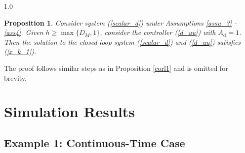 \documentclass[journal]{IEEEtran}
\newtheorem{proposition}{Proposition}
\newtheorem{remark}{Remark}
\begin{document}
\begin{spacing}{1.0}
\begin{proposition}
\label{corl2}Consider system (\ref{scalar_d}) under Assumptions \ref{assu_3}%
-\ref{ass4}. Given $h\geq\max\{D_{M},1\}$, consider the controller
(\ref{d_uu}) with $A_{\mathrm{d}}=1$. Then the solution to the closed-loop
system (\ref{scalar_d}) and (\ref{d_uu}) satisfies (\ref{x_k_1}).
\end{proposition}

The proof follows similar steps as in Proposition \ref{corl1} and is omitted
for brevity.


\section{\label{sec4}Simulation Results}

\subsection{Example 1: Continuous-Time Case}


\end{spacing}
\end{document}
